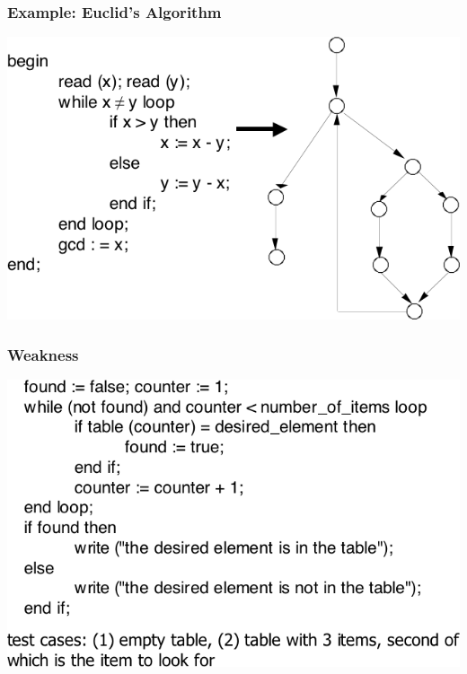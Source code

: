 \documentclass[t,12pt,numbers,fleqn]{beamer}
\begin{document}
\begin{frame}
\frametitle{Example: Euclid's Algorithm}

\includegraphics[scale=0.5]{../Figures/EuclidsAlgorithm.png}

\end{frame}


\begin{frame}
\frametitle{Weakness}

\includegraphics[scale=0.4]{../Figures/WeaknessEdgeCoverage.png}\\

\end{frame}


\begin{frame}

\lstset{language=java,breaklines=true,showspaces=false,showstringspaces=false,breakatwhitespace=true}
\noindent 

\end{frame}
\end{document}
